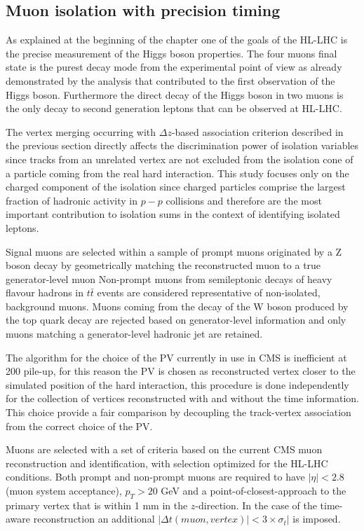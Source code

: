 \subsection{Muon isolation with precision timing}
As explained at the beginning of the chapter one of the goals of the HL-LHC is the precise measurement
of the Higgs boson properties. The four muons final state is the purest decay mode from the experimental point of
view as already demonstrated by the analysis that contributed to the first observation of the Higgs boson.
Furthermore the direct decay of the Higgs boson in two muons is the only decay to second generation
leptons that can be observed at HL-LHC.

The vertex merging occurring with $\Delta z$-based association criterion described in the previous section
directly affects the discrimination power of isolation variables since tracks from an unrelated vertex are
not excluded from the isolation cone of a particle coming from the real hard interaction.
This study focuses only on the charged component of the isolation since charged particles comprise
the largest fraction of hadronic activity in $p-p$ collisions and therefore are the most important contribution
to isolation sums in the context of identifying isolated leptons.

Signal muons are selected within a sample of prompt muons originated by a Z boson decay by geometrically matching the reconstructed
muon to a true generator-level muon
Non-prompt muons from semileptonic decays of heavy flavour hadrons in $t\bar{t}$ events are
considered representative of non-isolated, background muons. Muons coming from the decay of the W boson produced
by the top quark decay are rejected based on generator-level information and only muons matching a generator-level
hadronic jet are retained.

The algorithm for the choice of the PV currently in use in CMS is inefficient at 200 pile-up, for this reason
the PV is chosen as reconstructed vertex closer to the simulated position of the hard interaction, this procedure
is done independently for the collection of vertices reconstructed with and without the time information.
This choice provide a fair comparison by decoupling the track-vertex association from the correct choice of the PV.

Muons are selected with a set of criteria based on the current CMS muon reconstruction and identification, with
selection optimized for the HL-LHC conditions. Both prompt and non-prompt muons are required to have $|\eta|<2.8$
(muon system acceptance), $p_T > 20$ GeV and a point-of-closest-approach to the primary vertex that is within 1 mm in the
$z$-direction. In the case of the time-aware reconstruction an additional $|\Delta t(muon, vertex)| < 3\times\sigma_t|$
is imposed.


